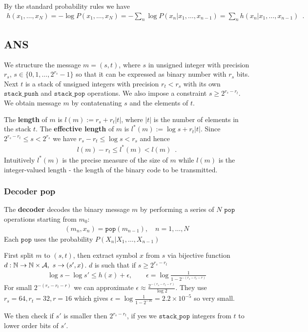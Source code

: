 By the standard probability rules we have
\begin{align*}
h(x_1, \ldots, x_N) = - \log P(x_1, \ldots, x_N) = - \sum_n \log P(x_n | x_1, \ldots, x_{n-1}) = \sum_n h(x_n | x_1, \ldots, x_{n-1}) \enspace .
\end{align*}

\subsection{ANS}\label{sec:rANS_ANS}

We structure the message $m = (s, t)$, where $s$ in unsigned integer with precision $r_s$, $s \in \{0, 1, \ldots, 2^{r_s} - 1\}$ so that it can be expressed as binary number with $r_s$ bits.
Next $t$ is a stack of unsigned integers with precision $r_t < r_s$ with its own $\mathtt{stack\_push}$ and $\mathtt{stack\_pop}$ operations.
We also impose a constraint $s \geq 2^{r_s - r_t}$.
We obtain message $m$ by contatenating $s$ and the elements of $t$.

The \textbf{length} of $m$ is $l(m) := r_s + r_t |t|$, where $|t|$ is the number of elements in the stack $t$.
The \textbf{effective length} of $m$ is $l^*(m) := \log s + r_t |t|$.
Since $2^{r_s - r_t} \leq s < 2^{r_s}$ we have $r_s - r_t \leq \log s < r_s$ and hence
\begin{align}
l(m) - r_t \leq l^*(m) < l(m) \enspace.
\end{align}
Intuitively $l^*(m)$ is the precise measure of the size of $m$ while $l(m)$ is the integer-valued length - the length of the binary code to be transmitted.

\subsubsection{Decoder pop}

The \textbf{decoder} decodes the binary message $m$ by performing a series of $N$ $\mathtt{pop}$ operations starting from $m_0$:
\begin{align}
(m_n, x_n) = \mathtt{pop}(m_{n-1}), \quad n=1, \ldots, N
\end{align}
Each $\mathtt{pop}$ uses the probability $P(X_n | X_1, \ldots, X_{n-1})$

First split $m$ to $(s, t)$, then extract symbol $x$ from $s$ via bijective function $d : {\mathbb{N}} \to {\mathbb{N}} \times {\mathcal{A}}, \ s \to (s', x)$.
$d$ is such that if $s \geq 2^{r_s - r_t}$ 
\begin{align}
\log s - \log s' \leq h(x) + \epsilon, \qquad
\epsilon = \log \frac{1}{1 - 2^{-(r_s - r_t -r)}}
\end{align}
For small $2^{-(r_s - r_t -r)}$ we can approximate $\epsilon \approx \frac{2^{-(r_s - r_t -r)}}{\log 2}$. They use $r_s = 64, r_t = 32, r = 16$ which gives $\epsilon = \log \frac{1}{1 - 2^{-16}} = 2.2 \times 10^{-5}$ so very small.

We then check if $s'$ is smaller then $2^{r_s - r_t}$, if yes we $\mathtt{stack\_pop}$ integers from $t$ to lower order bits of $s'$.


\begin{algorithm}
\end{algorithm}
